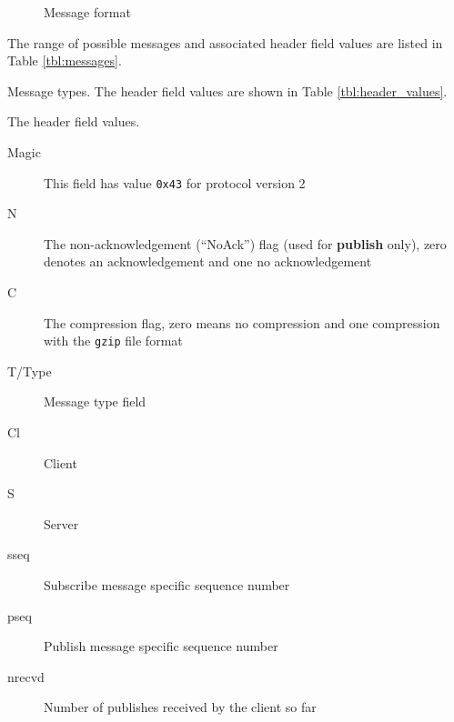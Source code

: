 \documentclass[a4paper]{article}
\begin{document}
\begin{figure}
	\begin{center}
		
		\caption{Message format}
		\label{fig:header}
	\end{center}
\end{figure}

The range of possible messages and associated header field values are listed in Table 
\ref{tbl:messages}.

\begin{table}
\begin{center}
\caption{Message types. The header field values are shown in Table \ref{tbl:header_values}.}

\label{tbl:messages}
\end{center}
\end{table}

\begin{table}
\caption{The header field values.}
\begin{description}
  \item[Magic] This field has value \texttt{0x43} for protocol version 2
  \item[N] The non-acknowledgement (``NoAck'') flag (used for \textbf{publish} only), zero
  denotes an acknowledgement and one no acknowledgement
  \item[C] The compression flag, zero means no compression and one compression
  with the \texttt{gzip} file format
  \item[T/Type] Message type field
  \item[Cl] Client
  \item[S] Server
  \item[sseq] Subscribe message specific sequence number
  \item[pseq] Publish message specific sequence number
  \item[nrecvd] Number of publishes received by the client so far
\end{description}
\label{tbl:header_values}
\end{table}

\pagebreak
\end{document}
